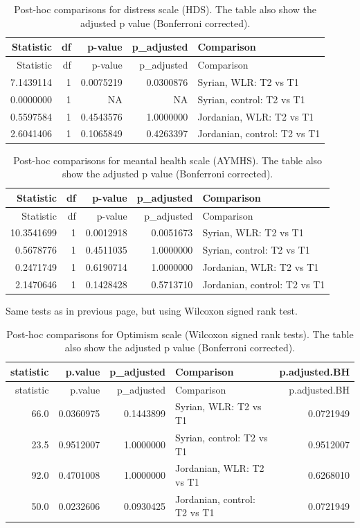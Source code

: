 \documentclass[]{article}
\begin{document}
\begin{longtable}[]{@{}rrrrl@{}}
\caption{Post-hoc comparisons for distress scale (HDS). The table also
show the adjusted p value (Bonferroni corrected).}\tabularnewline
\toprule
Statistic & df & p-value & p\_adjusted & Comparison\tabularnewline
\midrule
\endfirsthead
\toprule
Statistic & df & p-value & p\_adjusted & Comparison\tabularnewline
\midrule
\endhead
7.1439114 & 1 & 0.0075219 & 0.0300876 & Syrian, WLR: T2 vs
T1\tabularnewline
0.0000000 & 1 & NA & NA & Syrian, control: T2 vs T1\tabularnewline
0.5597584 & 1 & 0.4543576 & 1.0000000 & Jordanian, WLR: T2 vs
T1\tabularnewline
2.6041406 & 1 & 0.1065849 & 0.4263397 & Jordanian, control: T2 vs
T1\tabularnewline
\bottomrule
\end{longtable}

\begin{longtable}[]{@{}rrrrl@{}}
\caption{Post-hoc comparisons for meantal health scale (AYMHS). The
table also show the adjusted p value (Bonferroni
corrected).}\tabularnewline
\toprule
Statistic & df & p-value & p\_adjusted & Comparison\tabularnewline
\midrule
\endfirsthead
\toprule
Statistic & df & p-value & p\_adjusted & Comparison\tabularnewline
\midrule
\endhead
10.3541699 & 1 & 0.0012918 & 0.0051673 & Syrian, WLR: T2 vs
T1\tabularnewline
0.5678776 & 1 & 0.4511035 & 1.0000000 & Syrian, control: T2 vs
T1\tabularnewline
0.2471749 & 1 & 0.6190714 & 1.0000000 & Jordanian, WLR: T2 vs
T1\tabularnewline
2.1470646 & 1 & 0.1428428 & 0.5713710 & Jordanian, control: T2 vs
T1\tabularnewline
\bottomrule
\end{longtable}

\newpage

Same tests as in previous page, but using Wilcoxon signed rank test.

\begin{longtable}[]{@{}rrrlr@{}}
\caption{Post-hoc comparisons for Optimism scale (Wilcoxon signed rank
tests). The table also show the adjusted p value (Bonferroni
corrected).}\tabularnewline
\toprule
statistic & p.value & p\_adjusted & Comparison &
p.adjusted.BH\tabularnewline
\midrule
\endfirsthead
\toprule
statistic & p.value & p\_adjusted & Comparison &
p.adjusted.BH\tabularnewline
\midrule
\endhead
66.0 & 0.0360975 & 0.1443899 & Syrian, WLR: T2 vs T1 &
0.0721949\tabularnewline
23.5 & 0.9512007 & 1.0000000 & Syrian, control: T2 vs T1 &
0.9512007\tabularnewline
92.0 & 0.4701008 & 1.0000000 & Jordanian, WLR: T2 vs T1 &
0.6268010\tabularnewline
50.0 & 0.0232606 & 0.0930425 & Jordanian, control: T2 vs T1 &
0.0721949\tabularnewline
\bottomrule
\end{longtable}
\end{document}
